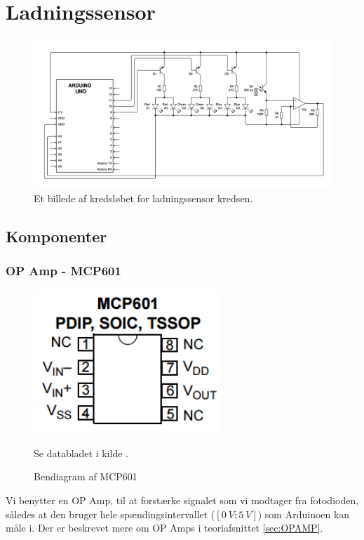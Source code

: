 \section{Ladningssensor}
\begin{figure}[H]
	\centering
    \includegraphics[width=\textwidth]{figures/CIRCUITS/farvesensorFinal.png}
	\caption{Et billede af kredsløbet for ladningssensor kredsen.}
	\label{fig:ladningsensor}
\end{figure}

\subsection{Komponenter}
\subsubsection{OP Amp - MCP601}
\begin{figure}[H]
	\centering
    \includegraphics[width=7cm]{figures/komponenter/OPAMP}
	\caption{Bendiagram af MCP601}
	Se databladet i kilde \cite{kompOPAMP}.
\end{figure}
Vi benytter en OP Amp, til at forstærke signalet som vi modtager fra fotodioden, således at den bruger hele spændingsintervallet ($[\SI{0}{V};\SI{5}{V}]$) som Arduinoen kan måle i. Der er beskrevet mere om OP Amps i teoriafsnittet \ref{sec:OPAMP}.
